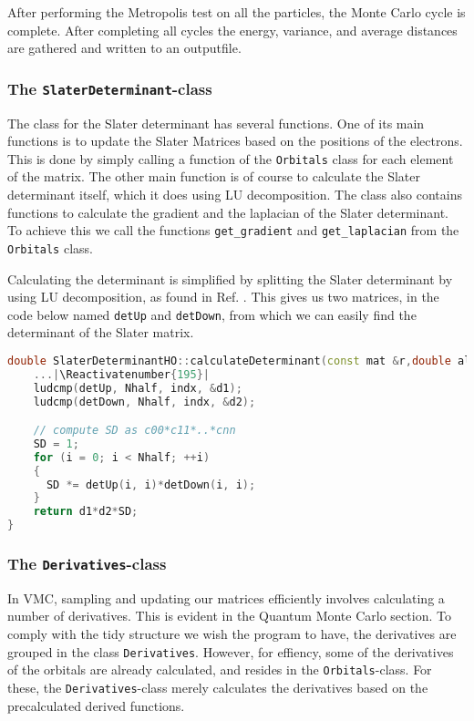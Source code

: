 	After performing the Metropolis test on all the particles, the Monte Carlo cycle is complete. After completing all cycles the energy, variance, and average distances are gathered and written to an outputfile. 


	\subsubsection{The {\tt SlaterDeterminant}-class}
		The class for the Slater determinant has several
                functions. One of its main functions is to update the
                Slater Matrices based on the positions of the
                electrons. This is done by simply calling a function
                of the {\tt Orbitals} class for each element of the
                matrix. The other main function is of course to
                calculate the Slater determinant itself, which it does
                using LU decomposition. The class also contains
                functions to calculate the gradient and the laplacian
                of the Slater determinant. To achieve this we  call the
                functions {\tt get\_gradient} and {\tt get\_laplacian}
                from the {\tt Orbitals} class.

		Calculating the determinant is simplified by splitting
                the Slater determinant by using LU decomposition, as
                found in Ref. \cite{press2007numerical}. This gives us
                two matrices, in the code below named {\tt detUp} and
                {\tt detDown}, from which we can easily find the
                determinant of the Slater matrix.
\begin{lstlisting}[language=C++, firstnumber=167]
double SlaterDeterminantHO::calculateDeterminant(const mat &r,double alpha, VMCSolver *solver){|\Suppressnumber|
	...|\Reactivatenumber{195}|
	ludcmp(detUp, Nhalf, indx, &d1);
	ludcmp(detDown, Nhalf, indx, &d2);

	// compute SD as c00*c11*..*cnn
	SD = 1;
	for (i = 0; i < Nhalf; ++i)
	{
	  SD *= detUp(i, i)*detDown(i, i);
	}
	return d1*d2*SD;
}
\end{lstlisting}
	
	\subsubsection{The {\tt Derivatives}-class}

	In VMC, sampling and updating our matrices efficiently involves calculating a number of derivatives. This is evident in the Quantum Monte Carlo section. To comply with the tidy structure we wish the program to have, the derivatives are grouped in the class {\tt Derivatives}. However, for effiency, some of the derivatives of the orbitals are already calculated, and resides in the {\tt Orbitals}-class. For these, the {\tt Derivatives}-class merely calculates the derivatives based on the precalculated derived functions.

